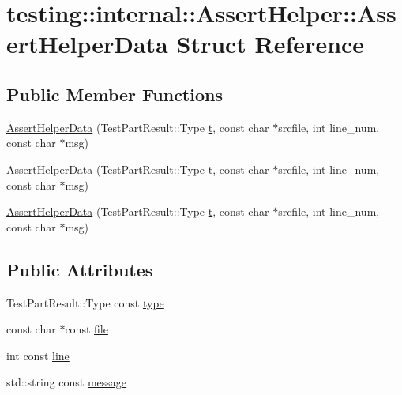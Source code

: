 \hypertarget{structtesting_1_1internal_1_1_assert_helper_1_1_assert_helper_data}{}\section{testing\+::internal\+::Assert\+Helper\+::Assert\+Helper\+Data Struct Reference}
\label{structtesting_1_1internal_1_1_assert_helper_1_1_assert_helper_data}
\subsection*{Public Member Functions}
\begin{DoxyCompactItemize}
\item 
\mbox{\hyperlink{structtesting_1_1internal_1_1_assert_helper_1_1_assert_helper_data_ad2356f3f1e56d1a63562efe0f8b3f1bb}{Assert\+Helper\+Data}} (Test\+Part\+Result\+::\+Type \mbox{\hyperlink{_mutual_8h_a978d88b393c8a37dc2614c88788b3442}{t}}, const char $\ast$srcfile, int line\+\_\+num, const char $\ast$msg)
\item 
\mbox{\hyperlink{structtesting_1_1internal_1_1_assert_helper_1_1_assert_helper_data_ad2356f3f1e56d1a63562efe0f8b3f1bb}{Assert\+Helper\+Data}} (Test\+Part\+Result\+::\+Type \mbox{\hyperlink{_mutual_8h_a978d88b393c8a37dc2614c88788b3442}{t}}, const char $\ast$srcfile, int line\+\_\+num, const char $\ast$msg)
\item 
\mbox{\hyperlink{structtesting_1_1internal_1_1_assert_helper_1_1_assert_helper_data_ad2356f3f1e56d1a63562efe0f8b3f1bb}{Assert\+Helper\+Data}} (Test\+Part\+Result\+::\+Type \mbox{\hyperlink{_mutual_8h_a978d88b393c8a37dc2614c88788b3442}{t}}, const char $\ast$srcfile, int line\+\_\+num, const char $\ast$msg)
\end{DoxyCompactItemize}
\subsection*{Public Attributes}
\begin{DoxyCompactItemize}
\item 
Test\+Part\+Result\+::\+Type const \mbox{\hyperlink{structtesting_1_1internal_1_1_assert_helper_1_1_assert_helper_data_a7b1d1a77882cd82107acea856d45692f}{type}}
\item 
const char $\ast$const \mbox{\hyperlink{structtesting_1_1internal_1_1_assert_helper_1_1_assert_helper_data_af1d98eabdf941fcceba7c0b4944cae8b}{file}}
\item 
int const \mbox{\hyperlink{structtesting_1_1internal_1_1_assert_helper_1_1_assert_helper_data_aff816673320ecd035288dffe44760f90}{line}}
\item 
std\+::string const \mbox{\hyperlink{structtesting_1_1internal_1_1_assert_helper_1_1_assert_helper_data_ae81536d57b8deb5dca4159cc6f7efdf0}{message}}
\end{DoxyCompactItemize}

